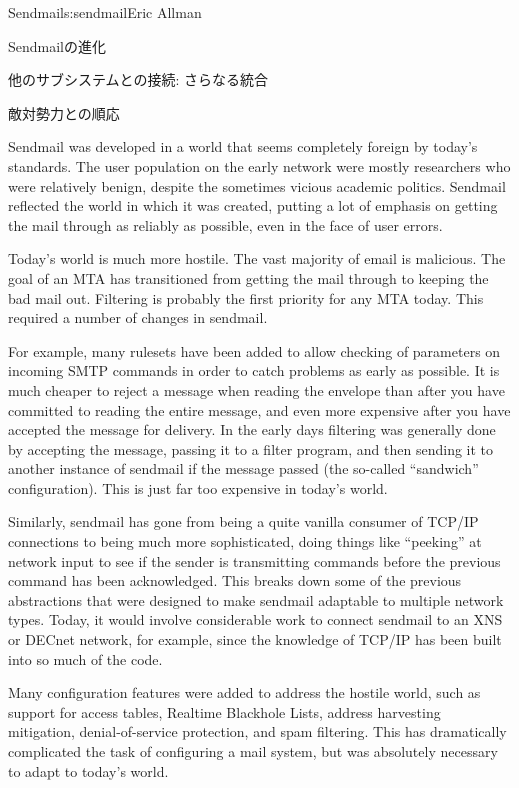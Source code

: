\begin{aosachapter}{Sendmail}{s:sendmail}{Eric Allman}
\begin{aosasect1}{Sendmailの進化}
\begin{aosasect2}{他のサブシステムとの接続: さらなる統合}
\end{aosasect2}

\begin{aosasect2}{敵対勢力との順応}

Sendmail was developed in a world that seems completely foreign by
today's standards. The user population on the early network were
mostly researchers who were relatively benign, despite the sometimes
vicious academic politics.  Sendmail reflected the world in which it
was created, putting a lot of emphasis on getting the mail through as
reliably as possible, even in the face of user errors.

Today's world is much more hostile. The vast majority of email is
malicious. The goal of an MTA has transitioned from getting the mail
through to keeping the bad mail out. Filtering is probably the first
priority for any MTA today.  This required a number of changes in
sendmail.

For example, many rulesets have been added to allow checking of
parameters on incoming SMTP commands in order to catch problems as
early as possible. It is much cheaper to reject a message when reading
the envelope than after you have committed to reading the entire
message, and even more expensive after you have accepted the message
for delivery. In the early days filtering was generally done by
accepting the message, passing it to a filter program, and then
sending it to another instance of sendmail if the message passed (the
so-called ``sandwich'' configuration). This is just far too expensive
in today's world.

Similarly, sendmail has gone from being a quite vanilla consumer of
TCP/IP connections to being much more sophisticated, doing things like
``peeking'' at network input to see if the sender is transmitting
commands before the previous command has been acknowledged. This
breaks down some of the previous abstractions that were designed to
make sendmail adaptable to multiple network types.  Today, it would
involve considerable work to connect sendmail to an XNS or DECnet
network, for example, since the knowledge of TCP/IP has been built
into so much of the code.

Many configuration features were added to address the hostile world,
such as support for access tables, Realtime Blackhole Lists, address
harvesting mitigation, denial-of-service protection, and spam
filtering.  This has dramatically complicated the task of configuring
a mail system, but was absolutely necessary to adapt to today's world.


\end{aosasect2}
\end{aosasect1}
\end{aosachapter}
